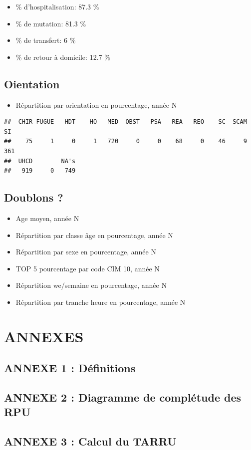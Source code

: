 \documentclass[]{article}
\begin{document}
\begin{itemize}
\itemsep1pt\parskip0pt
\item
  \% d'hospitalisation: 87.3 \%
\item
  \% de mutation: 81.3 \%
\item
  \% de transfert: 6 \%
\item
  \% de retour à domicile: 12.7 \%
\end{itemize}

\subsection{Oientation}\label{oientation}

\begin{itemize}
\itemsep1pt\parskip0pt
\item
  Répartition par orientation en pourcentage, année N
\end{itemize}

\begin{verbatim}
##  CHIR FUGUE   HDT    HO   MED  OBST   PSA   REA   REO    SC  SCAM    SI 
##    75     1     0     1   720     0     0    68     0    46     9   361 
##  UHCD        NA's 
##   919     0   749
\end{verbatim}

\subsection{Doublons ?}\label{doublons}

\begin{itemize}
\itemsep1pt\parskip0pt
\item
  Age moyen, année N
\item
  Répartition par classe âge en pourcentage, année N
\item
  Répartition par sexe en pourcentage, année N
\item
  TOP 5 pourcentage par code CIM 10, année N
\item
  Répartition we/semaine en pourcentage, année N
\item
  Répartition par tranche heure en pourcentage, année N
\end{itemize}

\section{ANNEXES}\label{annexes}

\subsection{ANNEXE 1 : Définitions}\label{annexe-1-definitions}

\subsection{ANNEXE 2 : Diagramme de complétude des
RPU}\label{annexe-2-diagramme-de-completude-des-rpu}

\subsection{ANNEXE 3 : Calcul du TARRU}\label{annexe-3-calcul-du-tarru}
\end{document}

